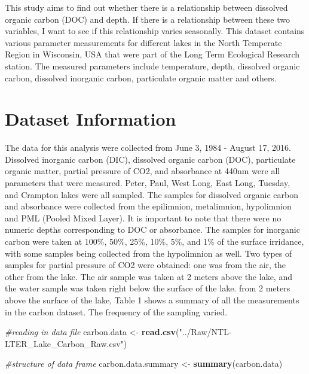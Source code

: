 \documentclass[12pt,]{article}
\newenvironment{Shaded}{\begin{snugshade}}{\end{snugshade}}
\newcommand{\KeywordTok}[1]{\textcolor[rgb]{0.13,0.29,0.53}{\textbf{#1}}}
\newcommand{\StringTok}[1]{\textcolor[rgb]{0.31,0.60,0.02}{#1}}
\newcommand{\CommentTok}[1]{\textcolor[rgb]{0.56,0.35,0.01}{\textit{#1}}}
\newcommand{\NormalTok}[1]{#1}
\begin{document}
This study aims to find out whether there is a relationship between
dissolved organic carbon (DOC) and depth. If there is a relationship
between these two variables, I want to see if this relationship varies
seasonally. This dataset contains various parameter measurements for
different lakes in the North Temperate Region in Wisconsin, USA that
were part of the Long Term Ecological Research station. The measured
parameters include temperature, depth, dissolved organic carbon,
dissolved inorganic carbon, particulate organic matter and others.

\newpage

\section{Dataset Information}\label{dataset-information}

The data for this analysis were collected from June 3, 1984 - August 17,
2016. Dissolved inorganic carbon (DIC), dissolved organic carbon (DOC),
particulate organic matter, partial pressure of CO2, and absorbance at
440nm were all parameters that were measured. Peter, Paul, West Long,
East Long, Tuesday, and Crampton lakes were all sampled. The samples for
dissolved organic carbon and absorbance were collected from the
epilimnion, metalimnion, hypolimnion and PML (Pooled Mixed Layer). It is
important to note that there were no numeric depths corresponding to DOC
or absorbance. The samples for inorganic carbon were taken at 100\%,
50\%, 25\%, 10\%, 5\%, and 1\% of the surface irridance, with some
samples being collected from the hypolimnion as well. Two types of
samples for partial pressure of CO2 were obtained: one was from the air,
the other from the lake. The air sample was taken at 2 meters above the
lake, and the water sample was taken right below the surface of the
lake. from 2 meters above the surface of the lake, Table 1 shows a
summary of all the measurements in the carbon dataset. The frequency of
the sampling varied.

\begin{Shaded}
\begin{Highlighting}[]
\CommentTok{#reading in data file}
\NormalTok{carbon.data <-}\StringTok{ }\KeywordTok{read.csv}\NormalTok{(}\StringTok{"../Raw/NTL-LTER_Lake_Carbon_Raw.csv"}\NormalTok{)}

\CommentTok{#structure of data frame}
\NormalTok{carbon.data.summary <-}\StringTok{ }\KeywordTok{summary}\NormalTok{(carbon.data)}
\end{Highlighting}
\end{Shaded}
\end{document}
